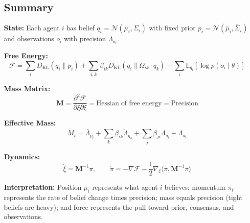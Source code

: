 \documentclass[12pt]{article}
\begin{document}
\subsection{Summary}

\begin{tcolorbox}[colback=gray!5,colframe=gray!75,title=The Complete Theory with Sensory Evidence]

\textbf{State:} Each agent $i$ has belief $q_i = \mathcal{N}(\mu_i, \Sigma_i)$ with fixed prior $p_i = \mathcal{N}(\bar{\mu}_i, \bar{\Sigma}_i)$ and observations $o_i$ with precision $\Lambda_{o_i}$.

\textbf{Free Energy:}
\begin{equation}
\mathcal{F} = \sum_i D_{\mathrm{KL}}(q_i \| p_i) + \sum_{i,k} \beta_{ik} D_{\mathrm{KL}}(q_i \| \Omega_{ik}\cdot q_k) - \sum_i \mathbb{E}_{q_i}[\log p(o_i \mid \theta)]
\end{equation}

\textbf{Mass Matrix:}
\begin{equation}
\mathbf{M} = \frac{\partial^2 \mathcal{F}}{\partial \xi \partial \xi} = \text{Hessian of free energy} = \text{Precision}
\end{equation}

\textbf{Effective Mass:}
\begin{equation}
M_i = \bar{\Lambda}_{p_i} + \sum_k \beta_{ik}\tilde{\Lambda}_{q_k} + \sum_j \beta_{ji}\Lambda_{q_i} + \Lambda_{o_i}
\end{equation}

\textbf{Dynamics:}
\begin{equation}
\dot{\xi} = \mathbf{M}^{-1}\pi, \qquad \dot{\pi} = -\nabla\mathcal{F} - \frac{1}{2}\nabla_\xi\langle\pi, \mathbf{M}^{-1}\pi\rangle
\end{equation}

\textbf{Interpretation:} Position $\mu_i$ represents what agent $i$ believes; momentum $\pi_i$ represents the rate of belief change times precision; mass equals precision (tight beliefs are heavy); and force represents the pull toward prior, consensus, and observations.

\end{tcolorbox}

\end{document}
